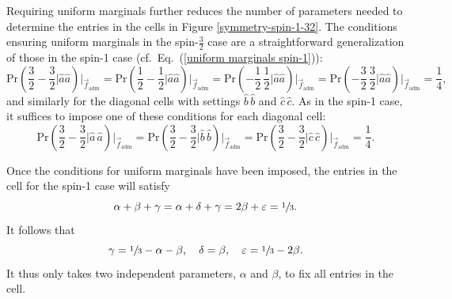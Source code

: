 Requiring uniform marginals further reduces the number of parameters needed to determine the entries in the cells in Figure \ref{symmetry-spin-1-32}. The conditions ensuring uniform marginals in the spin-$\frac32$ case are a straightforward generalization of those in the spin-1 case (cf.\ Eq.\ (\ref{uniform marginals spin-1})):
\begin{equation}
\mathrm{Pr}\!\left({\textstyle{\frac32}} -\!\!{\textstyle{\frac32}} \Big|\hat{a}\hat{a}\!\right) \!\!  \Big|_{\!\vec{f}_{\mathrm{adm}}} \!\!\!
= \mathrm{Pr}\!\left({\textstyle{\frac12}} -\!\!{\textstyle{\frac12}} \Big|\hat{a}\hat{a}\!\right) \!\! \Big|_{\!\vec{f}_{\mathrm{adm}}} \!\!\!
= \mathrm{Pr}\!\left(-\!{\textstyle{\frac12}} \, {\textstyle{\frac12}} \Big|\hat{a}\hat{a}\!\right)  \!\! \Big|_{\!\vec{f}_{\mathrm{adm}}} \!\!\!
= \mathrm{Pr}\!\left(-\!{\textstyle{\frac32}} \, {\textstyle{\frac32}} \Big|\hat{a}\hat{a}\!\right) \!\! \Big|_{\!\vec{f}_{\mathrm{adm}}} \!\!\!
=  \frac14,
\label{uniform marginals spin-32}
\end{equation}
and similarly for the diagonal cells with settings $\hat{b}\,\hat{b}$ and $\hat{c}\,\hat{c}$. As in the spin-1 case, it suffices to impose one of these conditions for each diagonal cell:
\begin{equation}
\mathrm{Pr}\!\left({\textstyle{\frac32}} -\!\!{\textstyle{\frac32}} \Big|\hat{a}\,\hat{a}\right) \!  \Big|_{\vec{f}_{\mathrm{adm}}} \!\!
= \mathrm{Pr}\!\left({\textstyle{\frac32}} -\!\!{\textstyle{\frac32}} \Big|\hat{b}\,\hat{b}\right) \!  \Big|_{\vec{f}_{\mathrm{adm}}} \!\!
= \mathrm{Pr}\!\left({\textstyle{\frac32}} -\!\!{\textstyle{\frac32}} \Big|\hat{c}\,\hat{c}\right) \!  \Big|_{\vec{f}_{\mathrm{adm}}} \!\!
=  \frac14.
\label{uniform marginals spin-32 a}
\end{equation}

Once the conditions for uniform marginals have been imposed, the entries in the cell for the spin-1 case will satisfy
\begin{equation}
\alpha + \beta + \gamma = \alpha + \delta + \gamma = 2\beta + \varepsilon = \sfrac13.
\label{spin 1 relations parameters} 
\end{equation}
It follows that 
\begin{equation}
\gamma = \sfrac13 - \alpha - \beta, \quad \delta = \beta, \quad \varepsilon = \sfrac13 - 2\beta.
\label{spin 1 gamma delta epsilon}
\end{equation}
It thus only takes two independent parameters, $\alpha$ and $\beta$, to fix all entries in the cell. 

